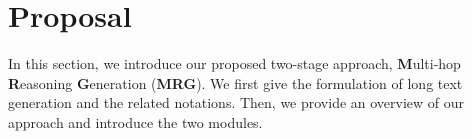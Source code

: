 \documentclass[letterpaper]{article} %
\begin{document}

 

\section{Proposal}
In this section, we introduce our proposed two-stage approach, \textbf{M}ulti-hop \textbf{R}easoning \textbf{G}eneration (\textbf{MRG}). We first give the formulation of long text generation and the related notations. Then, we provide an overview of our approach and introduce the two modules.
\end{document}
